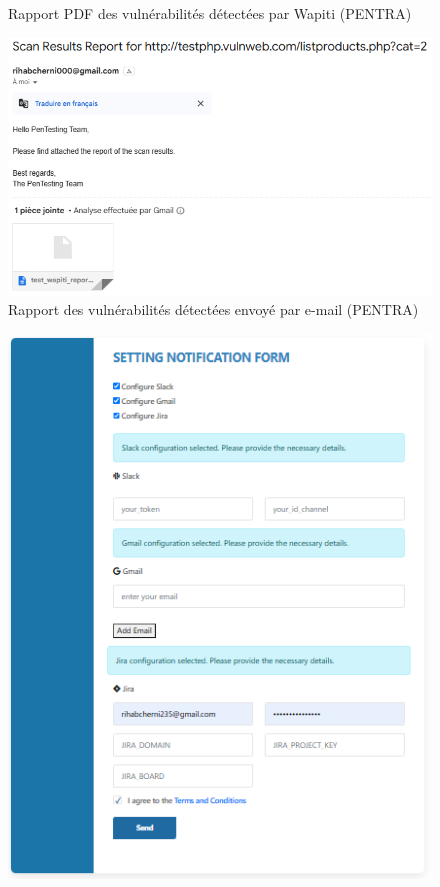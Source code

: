 \begin{justify}
\begin{enumerate}
\begin{figure}[H]
            \caption{\centering Rapport PDF des vulnérabilités détectées par Wapiti (PENTRA)}
            \label{fig:PENTRA-V1-9}
        \end{figure}
        \vspace{-0.5cm}
        \begin{figure}[H]
            \centering
            \includegraphics[width=0.8\linewidth]{Annexe/PENTRA-V1/email.PNG}
            \caption{\centering Rapport des vulnérabilités détectées envoyé par e-mail (PENTRA)}
            \label{fig:PENTRA-V1-email}
        \end{figure}
        \vspace{-0.3cm}
        \begin{figure}[H]
            \centering
            \includegraphics[width=0.8\linewidth]{Annexe/PENTRA-V1/11.PNG}

\end{figure}
\end{enumerate}
\end{justify}
